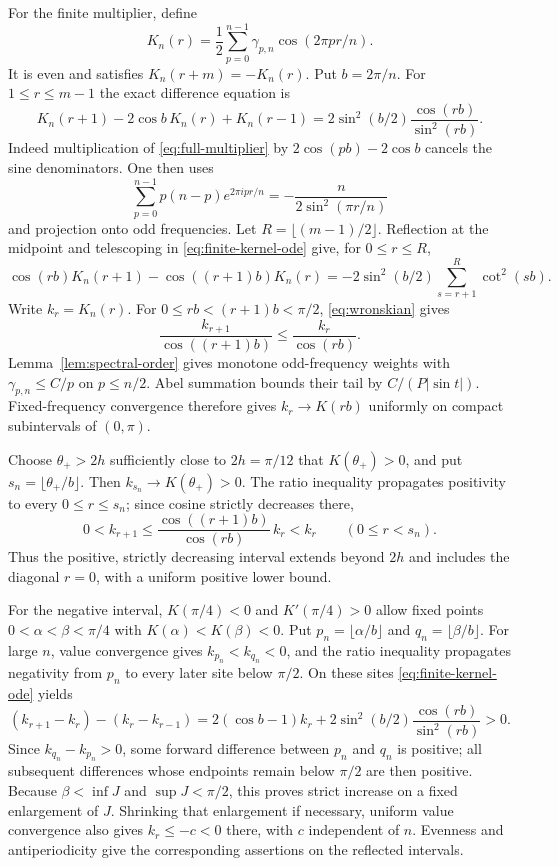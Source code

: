 \documentclass[11pt,reqno]{amsart}
\numberwithin{equation}{section}
\theoremstyle{definition}
\theoremstyle{remark}
\begin{document}
For the finite multiplier, define
\begin{equation}\label{eq:finite-kernel}
 K_n(r)=\frac12\sum_{p=0}^{n-1}\gamma_{p,n}\cos(2\pi pr/n).
\end{equation}
It is even and satisfies $K_n(r+m)=-K_n(r)$. Put $b=2\pi/n$. For $1\le r\le m-1$ the exact difference equation is
\begin{equation}\label{eq:finite-kernel-ode}
 K_n(r+1)-2\cos b\,K_n(r)+K_n(r-1)
 =2\sin^2(b/2)\frac{\cos(rb)}{\sin^2(rb)}.
\end{equation}
Indeed multiplication of \eqref{eq:full-multiplier} by $2\cos(pb)-2\cos b$ cancels the sine denominators. One then uses
\[
 \sum_{p=0}^{n-1}p(n-p)e^{2\pi ipr/n}
 =-\frac n{2\sin^2(\pi r/n)}
\]
and projection onto odd frequencies. Let $R=\lfloor(m-1)/2\rfloor$. Reflection at the midpoint and telescoping in \eqref{eq:finite-kernel-ode} give, for $0\le r\le R$,
\begin{equation}\label{eq:wronskian}
 \cos(rb)K_n(r+1)-\cos((r+1)b)K_n(r)
 =-2\sin^2(b/2)\sum_{s=r+1}^{R}\cot^2(sb).
\end{equation}
Write $k_r=K_n(r)$. For $0\le rb<(r+1)b<\pi/2$, \eqref{eq:wronskian} gives
\[
 \frac{k_{r+1}}{\cos((r+1)b)}\le\frac{k_r}{\cos(rb)}.
\]
Lemma~\ref{lem:spectral-order} gives monotone odd-frequency weights with $\gamma_{p,n}\le C/p$ on $p\le n/2$. Abel summation bounds their tail by $C/(P|\sin t|)$. Fixed-frequency convergence therefore gives $k_r\to K(rb)$ uniformly on compact subintervals of $(0,\pi)$.

Choose $\theta_+>2h$ sufficiently close to $2h=\pi/12$ that $K(\theta_+)>0$, and put $s_n=\lfloor\theta_+/b\rfloor$. Then $k_{s_n}\to K(\theta_+)>0$. The ratio inequality propagates positivity to every $0\le r\le s_n$; since cosine strictly decreases there,
\[
 0<k_{r+1}\le\frac{\cos((r+1)b)}{\cos(rb)}\,k_r<k_r
 \qquad(0\le r<s_n).
\]
Thus the positive, strictly decreasing interval extends beyond $2h$ and includes the diagonal $r=0$, with a uniform positive lower bound.

For the negative interval, $K(\pi/4)<0$ and $K'(\pi/4)>0$ allow fixed points $0<\alpha<\beta<\pi/4$ with $K(\alpha)<K(\beta)<0$. Put $p_n=\lfloor\alpha/b\rfloor$ and $q_n=\lfloor\beta/b\rfloor$. For large $n$, value convergence gives $k_{p_n}<k_{q_n}<0$, and the ratio inequality propagates negativity from $p_n$ to every later site below $\pi/2$. On these sites \eqref{eq:finite-kernel-ode} yields
\[
 (k_{r+1}-k_r)-(k_r-k_{r-1})
 =2(\cos b-1)k_r
   +2\sin^2(b/2)\frac{\cos(rb)}{\sin^2(rb)}>0.
\]
Since $k_{q_n}-k_{p_n}>0$, some forward difference between $p_n$ and $q_n$ is positive; all subsequent differences whose endpoints remain below $\pi/2$ are then positive. Because $\beta<\inf J$ and $\sup J<\pi/2$, this proves strict increase on a fixed enlargement of $J$. Shrinking that enlargement if necessary, uniform value convergence also gives $k_r\le-c<0$ there, with $c$ independent of $n$. Evenness and antiperiodicity give the corresponding assertions on the reflected intervals.
\end{document}
